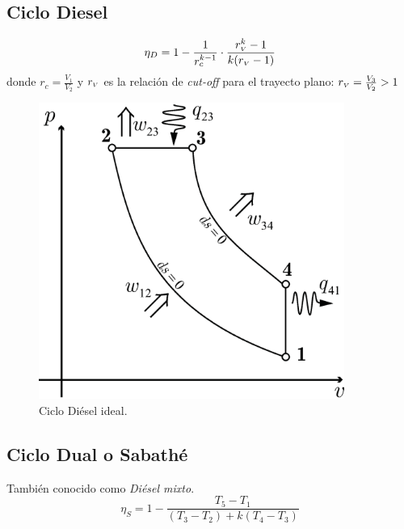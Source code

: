 \documentclass{article}
\newcommand{\ctegas}{k}
\newcommand{\rc}{r_c}
\newcommand{\rv}{r_{\mbox{\tiny$V$}}}
\begin{document}
\subsection{Ciclo Diesel}

\begin{equation}
\eta_D=1-\frac{1}{\rc^{\ctegas-1}}\cdot\frac{\rv^k -1}{\ctegas(\rv-1)}
\end{equation}
donde $\rc=\frac{V_1}{V_2}$ y $\rv$ es la relación de \textit{cut-off} para el trayecto plano: $\rv=\frac{V_3}{V_2}>1$
\begin{figure}[htb!]
    \centering
    \includegraphics[width=10cm]{fig/ciclodiesel.eps}
    \caption{Ciclo Diésel ideal.}
    \label{fig:dieselideal}
\end{figure}

\subsection{Ciclo Dual o Sabathé}
También conocido como \textit{Diésel mixto}. 
\begin{equation}
\eta_S=1- \frac{T_5-T_1}{(T_3-T_2)+\ctegas(T_4-T_3)}
\end{equation}
\end{document}
